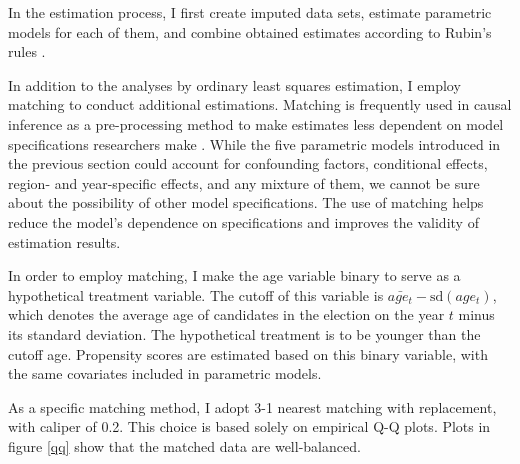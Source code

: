 \documentclass[a4paper, 12pt]{article}\usepackage[dvipdfmx]{graphicx}\usepackage[]{xcolor}
\begin{document}
In the estimation process, I first create imputed data sets, estimate parametric models for each of them, and combine obtained estimates according to Rubin's rules \citep{schafer1998multiple} \footnotemark{}.


In addition to the analyses by ordinary least squares estimation, I employ matching to conduct additional estimations. Matching is frequently used in causal inference as a pre-processing method to make estimates less dependent on model specifications researchers make \citep{ho2007matching}. While the five parametric models introduced in the previous section could account for confounding factors, conditional effects, region- and year-specific effects, and any mixture of them, we cannot be sure about the possibility of other model specifications. The use of matching helps reduce the model's dependence on specifications and improves the validity of estimation results. 

In order to employ matching, I make the age variable binary to serve as a hypothetical treatment variable. The cutoff of this variable is $\bar{age_{t}} - \text{sd}(age_{t})$, which denotes the average age of candidates in the election on the year $t$ minus its standard deviation. The hypothetical treatment is to be younger than the cutoff age. Propensity scores are estimated based on this binary variable, with the same covariates included in parametric models. 

As a specific matching method, I adopt 3-1 nearest matching with replacement, with caliper of 0.2. This choice is based solely on empirical Q-Q plots. Plots in figure \ref{qq} show that the matched data are well-balanced. 
\end{document}
